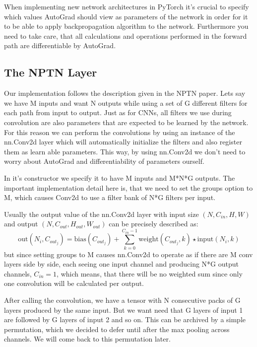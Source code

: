 \documentclass{llncs}
\begin{document}
When implementing new network architectures in PyTorch it's crucial to specify which values AutoGrad should view as parameters of the network in order for it to be able to apply backpropagation algorithm to the network. Furthermore you need to take care, that all calculations and operations performed in the forward path are differentiable by AutoGrad.
\subsection{The NPTN Layer}
Our implementation follows the description given in the NPTN paper.
Lets say we have M inputs and want N outputs while using a set of G different filters for each path from input to output.
Just as for CNNs, all filters we use during convolution are also parameters that are expected to be learned by the network.
For this reason we can perform the convolutions by using an instance of the nn.Conv2d layer which will automatically initialize the filters and also register them as learn able parameters. This way, by using nn.Conv2d we don't need to worry about AutoGrad and differentiability of parameters ourself.

In it's constructor we specify it to have M inputs and M*N*G outputs. The important implementation detail here is, that we need to set the groups option to M, which causes Conv2d to use a filter bank of N*G filters per input.

Usually the output value of the nn.Conv2d layer with input size $(N, C_{in}, H, W)$ and output $(N, C_{out}, H_{out}, W_{out})$ can be precisely described as:
\begin{equation*}
\text{out}(N_i, C_{out_j}) = \text{bias}(C_{out_j}) +
\sum_{k = 0}^{C_{in} - 1} \text{weight}(C_{out_j}, k) \star \text{input}(N_i, k)
\end{equation*}
but since setting groups to M causes nn.Conv2d to operate as if there are M conv layers side by side, each seeing one input channel and producing N*G output channels, $C_{in} = 1$, which means, that there will be no weighted sum since only one convolution will be calculated per output.

After calling the convolution, we have a tensor with N consecutive packs of G layers produced by the same input. But we want need that G layers of input 1 are followed by G layers of input 2 and so on. This can be archived by a simple permutation, which we decided to defer until after the max pooling across channels. We will come back to this permutation later.
\end{document}
